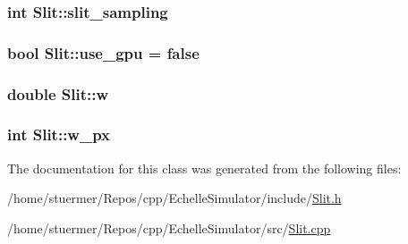 \subsubsection[{\texorpdfstring{slit\+\_\+sampling}{slit_sampling}}]{\setlength{\rightskip}{0pt plus 5cm}int Slit\+::slit\+\_\+sampling}\hypertarget{class_slit_ad5af377fe458ceb5c391be67ee58ac7b}{}\label{class_slit_ad5af377fe458ceb5c391be67ee58ac7b}
\subsubsection[{\texorpdfstring{use\+\_\+gpu}{use_gpu}}]{\setlength{\rightskip}{0pt plus 5cm}bool Slit\+::use\+\_\+gpu = false}\hypertarget{class_slit_af27ddf455c96b348f6b0f5c221e41b20}{}\label{class_slit_af27ddf455c96b348f6b0f5c221e41b20}
\subsubsection[{\texorpdfstring{w}{w}}]{\setlength{\rightskip}{0pt plus 5cm}double Slit\+::w}\hypertarget{class_slit_ae33a1c4c7205343947d2d3efdfdbd1dc}{}\label{class_slit_ae33a1c4c7205343947d2d3efdfdbd1dc}
\subsubsection[{\texorpdfstring{w\+\_\+px}{w_px}}]{\setlength{\rightskip}{0pt plus 5cm}int Slit\+::w\+\_\+px}\hypertarget{class_slit_ae6998ed65fc4b82946152b723786fc6c}{}\label{class_slit_ae6998ed65fc4b82946152b723786fc6c}


The documentation for this class was generated from the following files\+:\begin{DoxyCompactItemize}
\item 
/home/stuermer/\+Repos/cpp/\+Echelle\+Simulator/include/\hyperlink{_slit_8h}{Slit.\+h}\item 
/home/stuermer/\+Repos/cpp/\+Echelle\+Simulator/src/\hyperlink{_slit_8cpp}{Slit.\+cpp}\end{DoxyCompactItemize}
